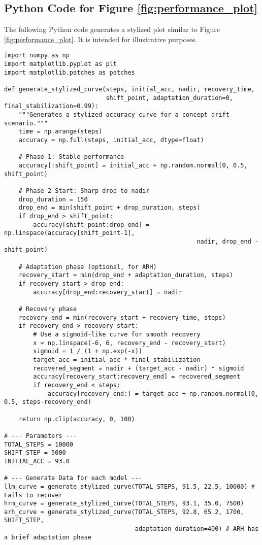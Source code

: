 \documentclass{article}
\begin{document}
\begin{appendices}
\section{Python Code for Figure \ref{fig:performance_plot}}
\label{sec:appendix_code}
The following Python code generates a stylized plot similar to Figure \ref{fig:performance_plot}. It is intended for illustrative purposes.

\begin{verbatim}
import numpy as np
import matplotlib.pyplot as plt
import matplotlib.patches as patches

def generate_stylized_curve(steps, initial_acc, nadir, recovery_time, 
                            shift_point, adaptation_duration=0, final_stabilization=0.99):
    """Generates a stylized accuracy curve for a concept drift scenario."""
    time = np.arange(steps)
    accuracy = np.full(steps, initial_acc, dtype=float)
    
    # Phase 1: Stable performance
    accuracy[:shift_point] = initial_acc + np.random.normal(0, 0.5, shift_point)

    # Phase 2 Start: Sharp drop to nadir
    drop_duration = 150
    drop_end = min(shift_point + drop_duration, steps)
    if drop_end > shift_point:
        accuracy[shift_point:drop_end] = np.linspace(accuracy[shift_point-1],
                                                     nadir, drop_end - shift_point)

    # Adaptation phase (optional, for ARH)
    recovery_start = min(drop_end + adaptation_duration, steps)
    if recovery_start > drop_end:
        accuracy[drop_end:recovery_start] = nadir

    # Recovery phase
    recovery_end = min(recovery_start + recovery_time, steps)
    if recovery_end > recovery_start:
        # Use a sigmoid-like curve for smooth recovery
        x = np.linspace(-6, 6, recovery_end - recovery_start)
        sigmoid = 1 / (1 + np.exp(-x))
        target_acc = initial_acc * final_stabilization
        recovered_segment = nadir + (target_acc - nadir) * sigmoid
        accuracy[recovery_start:recovery_end] = recovered_segment
        if recovery_end < steps:
            accuracy[recovery_end:] = target_acc + np.random.normal(0, 0.5, steps-recovery_end)
            
    return np.clip(accuracy, 0, 100)

# --- Parameters ---
TOTAL_STEPS = 10000
SHIFT_STEP = 5000
INITIAL_ACC = 93.0

# --- Generate Data for each model ---
llm_curve = generate_stylized_curve(TOTAL_STEPS, 91.5, 22.5, 10000) # Fails to recover
hrm_curve = generate_stylized_curve(TOTAL_STEPS, 93.1, 35.0, 7500)
arh_curve = generate_stylized_curve(TOTAL_STEPS, 92.8, 65.2, 1700, SHIFT_STEP, 
                                    adaptation_duration=400) # ARH has a brief adaptation phase


\end{verbatim}
\end{appendices}
\end{document}
